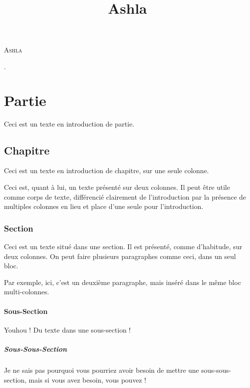 \documentclass[titlepage, 12pt, openright]{report}
\title{Ashla}
\begin{document}
	\begin{center}
		\medskip
		{\HUGE\textsc{Ashla}}
	\end{center}
	\newpage
	.
	\newpage
	\tableofcontents
	\listoffigures
	\newpage


	\part{Partie}
		Ceci est un texte en introduction de partie.
		
		\chapter{Chapitre}
			Ceci est un texte en introduction de chapitre, sur une seule colonne.
			
			\begin{multicols}{2}
				Ceci est, quant à lui, un texte présenté sur deux colonnes. Il peut être utile comme corps de texte, différencié clairement de l'introduction par la présence de multiples colonnes en lieu et place d'une seule pour l'introduction.
			\end{multicols}			
			
			\section{Section}
				\begin{multicols}{2}
					Ceci est un texte situé dans une section. Il est présenté, comme d'habitude, sur deux colonnes. On peut faire plusieurs paragraphes comme ceci, dans un seul bloc.
					
					Par exemple, ici, c'est un deuxième paragraphe, mais inséré dans le même bloc multi-colonnes.
				\end{multicols}
				
				\subsection{Sous-Section}
					\begin{multicols}{2}
						Youhou ! Du texte dans une sous-section !
					\end{multicols}
					
					\subsubsection{Sous-Sous-Section}
						\begin{multicols}{2}
							Je ne sais pas pourquoi vous pourriez avoir besoin de mettre une sous-sous-section, mais si vous avez besoin, vous pouvez !
						\end{multicols}
						
\end{document}
